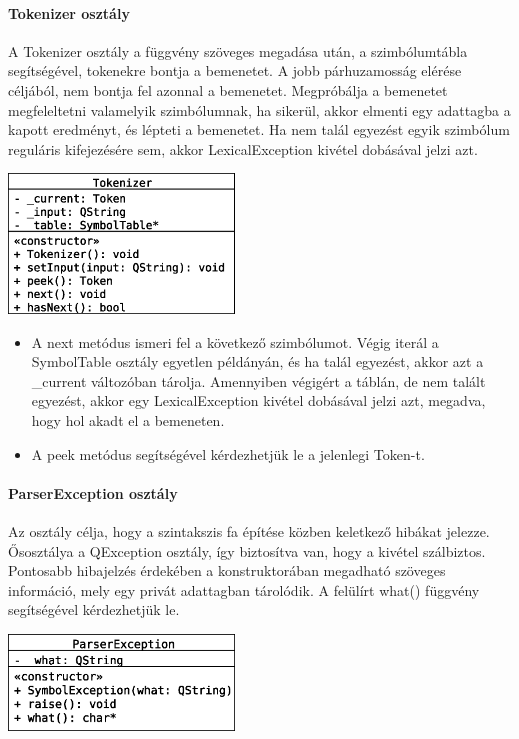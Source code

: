 \documentclass[12pt]{report}
\begin{document}
\paragraph{Tokenizer osztály}
A Tokenizer osztály a függvény szöveges megadása után, a szimbólumtábla segítségével, tokenekre bontja a bemenetet. A jobb párhuzamosság elérése céljából, nem bontja fel azonnal a bemenetet. Megpróbálja a bemenetet megfeleltetni valamelyik szimbólumnak, ha sikerül, akkor elmenti egy adattagba a kapott eredményt, és lépteti a bemenetet. Ha nem talál egyezést egyik szimbólum reguláris kifejezésére sem, akkor LexicalException kivétel dobásával jelzi azt.
\begin{center}
\includegraphics[width=6cm]{pics/uml/Tokenizer}
\end{center}
\begin{itemize}
\item A next metódus ismeri fel a következő szimbólumot. Végig iterál a SymbolTable osztály egyetlen példányán, és ha talál egyezést, akkor azt a \_current változóban tárolja. Amennyiben végigért a táblán, de nem talált egyezést, akkor egy LexicalException kivétel dobásával jelzi azt, megadva, hogy hol akadt el a bemeneten.
\item A peek metódus segítségével kérdezhetjük le a jelenlegi Token-t.
\end{itemize}

\paragraph{ParserException osztály}
Az osztály célja, hogy a szintakszis fa építése közben keletkező hibákat jelezze. Ősosztálya a QException osztály, így biztosítva van, hogy a kivétel szálbiztos. Pontosabb hibajelzés érdekében a konstruktorában megadható szöveges információ, mely egy privát adattagban tárolódik. A felülírt what() függvény segítségével kérdezhetjük le.
\begin{center}
\includegraphics[width=6cm]{pics/uml/ParserException}
\end{center}
\end{document}
